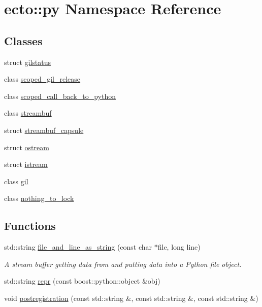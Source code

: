 \hypertarget{namespaceecto_1_1py}{\section{ecto\-:\-:py \-Namespace \-Reference}
\label{namespaceecto_1_1py}
}
\subsection*{\-Classes}
\begin{DoxyCompactItemize}
\item 
struct \hyperlink{structecto_1_1py_1_1gilstatus}{gilstatus}
\item 
class \hyperlink{classecto_1_1py_1_1scoped__gil__release}{scoped\-\_\-gil\-\_\-release}
\item 
class \hyperlink{classecto_1_1py_1_1scoped__call__back__to__python}{scoped\-\_\-call\-\_\-back\-\_\-to\-\_\-python}
\item 
class \hyperlink{classecto_1_1py_1_1streambuf}{streambuf}
\item 
struct \hyperlink{structecto_1_1py_1_1streambuf__capsule}{streambuf\-\_\-capsule}
\item 
struct \hyperlink{structecto_1_1py_1_1ostream}{ostream}
\item 
struct \hyperlink{structecto_1_1py_1_1istream}{istream}
\item 
class \hyperlink{classecto_1_1py_1_1gil}{gil}
\item 
class \hyperlink{classecto_1_1py_1_1nothing__to__lock}{nothing\-\_\-to\-\_\-lock}
\end{DoxyCompactItemize}
\subsection*{\-Functions}
\begin{DoxyCompactItemize}
\item 
std\-::string \hyperlink{namespaceecto_1_1py_a103dc3e3c8ee425860ae2260f930752e}{file\-\_\-and\-\_\-line\-\_\-as\-\_\-string} (const char $\ast$file, long line)
\begin{DoxyCompactList}\small\item\em \-A stream buffer getting data from and putting data into a \-Python file object. \end{DoxyCompactList}\item 
std\-::string \hyperlink{namespaceecto_1_1py_abc1149eb9720c52fa9191bf7ee10ccf2}{repr} (const boost\-::python\-::object \&obj)
\item 
void \hyperlink{namespaceecto_1_1py_a9baa9f1e5394841101cbdc2eab37094c}{postregistration} (const std\-::string \&, const std\-::string \&, const std\-::string \&)
\end{DoxyCompactItemize}


